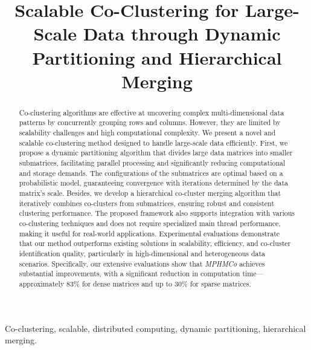 \documentclass[journal]{IEEEtran}
\begin{document}
\title{\LARGE \bf Scalable Co-Clustering for Large-Scale Data through Dynamic Partitioning and Hierarchical Merging}


\author{}
\maketitle

\begin{abstract}
  Co-clustering algorithms are effective at uncovering complex multi-dimensional data patterns by concurrently grouping rows and columns. However, they are limited by scalability challenges and high computational complexity. We present a novel and scalable co-clustering method designed to handle large-scale data efficiently. First, we propose a dynamic partitioning algorithm that divides large data matrices into smaller submatrices, facilitating parallel processing and significantly reducing computational and storage demands. The configurations of the submatrices are optimal based on a probabilistic model, guaranteeing convergence with iterations determined by the data matrix's scale. Besides, we develop a hierarchical co-cluster merging algorithm that iteratively combines co-clusters from submatrices, ensuring robust and consistent clustering performance. The proposed framework also supports integration with various co-clustering techniques and does not require specialized main thread performance, making it useful for real-world applications. Experimental evaluations demonstrate that our method outperforms existing solutions in scalability, efficiency, and co-cluster identification quality, particularly in high-dimensional and heterogeneous data scenarios. Specifically, our extensive evaluations show that \emph{MPHMCo} achieves substantial improvements, with a significant reduction in computation time—approximately 83\% for dense matrices and up to 30\% for sparse matrices.
\end{abstract}

\begin{IEEEkeywords}
  Co-clustering, scalable, distributed computing, dynamic partitioning, hierarchical merging.
\end{IEEEkeywords}
\end{document}
